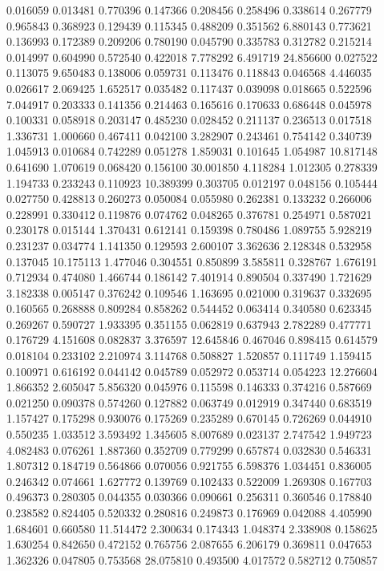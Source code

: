 0.016059
0.013481
0.770396
0.147366
0.208456
0.258496
0.338614
0.267779
0.965843
0.368923
0.129439
0.115345
0.488209
0.351562
6.880143
0.773621
0.136993
0.172389
0.209206
0.780190
0.045790
0.335783
0.312782
0.215214
0.014997
0.604990
0.572540
0.422018
7.778292
6.491719
24.856600
0.027522
0.113075
9.650483
0.138006
0.059731
0.113476
0.118843
0.046568
4.446035
0.026617
2.069425
1.652517
0.035482
0.117437
0.039098
0.018665
0.522596
7.044917
0.203333
0.141356
0.214463
0.165616
0.170633
0.686448
0.045978
0.100331
0.058918
0.203147
0.485230
0.028452
0.211137
0.236513
0.017518
1.336731
1.000660
0.467411
0.042100
3.282907
0.243461
0.754142
0.340739
1.045913
0.010684
0.742289
0.051278
1.859031
0.101645
1.054987
10.817148
0.641690
1.070619
0.068420
0.156100
30.001850
4.118284
1.012305
0.278339
1.194733
0.233243
0.110923
10.389399
0.303705
0.012197
0.048156
0.105444
0.027750
0.428813
0.260273
0.050084
0.055980
0.262381
0.133232
0.266006
0.228991
0.330412
0.119876
0.074762
0.048265
0.376781
0.254971
0.587021
0.230178
0.015144
1.370431
0.612141
0.159398
0.780486
1.089755
5.928219
0.231237
0.034774
1.141350
0.129593
2.600107
3.362636
2.128348
0.532958
0.137045
10.175113
1.477046
0.304551
0.850899
3.585811
0.328767
1.676191
0.712934
0.474080
1.466744
0.186142
7.401914
0.890504
0.337490
1.721629
3.182338
0.005147
0.376242
0.109546
1.163695
0.021000
0.319637
0.332695
0.160565
0.268888
0.809284
0.858262
0.544452
0.063414
0.340580
0.623345
0.269267
0.590727
1.933395
0.351155
0.062819
0.637943
2.782289
0.477771
0.176729
4.151608
0.082837
3.376597
12.645846
0.467046
0.898415
0.614579
0.018104
0.233102
2.210974
3.114768
0.508827
1.520857
0.111749
1.159415
0.100971
0.616192
0.044142
0.045789
0.052972
0.053714
0.054223
12.276604
1.866352
2.605047
5.856320
0.045976
0.115598
0.146333
0.374216
0.587669
0.021250
0.090378
0.574260
0.127882
0.063749
0.012919
0.347440
0.683519
1.157427
0.175298
0.930076
0.175269
0.235289
0.670145
0.726269
0.044910
0.550235
1.033512
3.593492
1.345605
8.007689
0.023137
2.747542
1.949723
4.082483
0.076261
1.887360
0.352709
0.779299
0.657874
0.032830
0.546331
1.807312
0.184719
0.564866
0.070056
0.921755
6.598376
1.034451
0.836005
0.246342
0.074661
1.627772
0.139769
0.102433
0.522009
1.269308
0.167703
0.496373
0.280305
0.044355
0.030366
0.090661
0.256311
0.360546
0.178840
0.238582
0.824405
0.520332
0.280816
0.249873
0.176969
0.042088
4.405990
1.684601
0.660580
11.514472
2.300634
0.174343
1.048374
2.338908
0.158625
1.630254
0.842650
0.472152
0.765756
2.087655
6.206179
0.369811
0.047653
1.362326
0.047805
0.753568
28.075810
0.493500
4.017572
0.582712
0.750857
